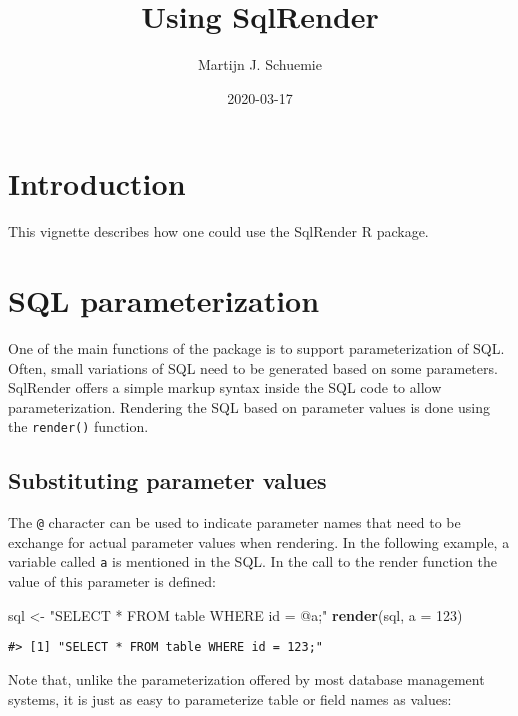\documentclass[
]{article}
\title{Using SqlRender}
\author{Martijn J. Schuemie}
\date{2020-03-17}
\newenvironment{Shaded}{\begin{snugshade}}{\end{snugshade}}
\newcommand{\DataTypeTok}[1]{\textcolor[rgb]{0.13,0.29,0.53}{#1}}
\newcommand{\DecValTok}[1]{\textcolor[rgb]{0.00,0.00,0.81}{#1}}
\newcommand{\KeywordTok}[1]{\textcolor[rgb]{0.13,0.29,0.53}{\textbf{#1}}}
\newcommand{\NormalTok}[1]{#1}
\newcommand{\StringTok}[1]{\textcolor[rgb]{0.31,0.60,0.02}{#1}}
\begin{document}
\maketitle

{
\setcounter{tocdepth}{2}
\tableofcontents
}
\hypertarget{introduction}{%
\section{Introduction}\label{introduction}}

This vignette describes how one could use the SqlRender R package.

\hypertarget{sql-parameterization}{%
\section{SQL parameterization}\label{sql-parameterization}}

One of the main functions of the package is to support parameterization
of SQL. Often, small variations of SQL need to be generated based on
some parameters. SqlRender offers a simple markup syntax inside the SQL
code to allow parameterization. Rendering the SQL based on parameter
values is done using the \texttt{render()} function.

\hypertarget{substituting-parameter-values}{%
\subsection{Substituting parameter
values}\label{substituting-parameter-values}}

The \texttt{@} character can be used to indicate parameter names that
need to be exchange for actual parameter values when rendering. In the
following example, a variable called \texttt{a} is mentioned in the SQL.
In the call to the render function the value of this parameter is
defined:

\begin{Shaded}
\begin{Highlighting}[]
\NormalTok{sql <-}\StringTok{ "SELECT * FROM table WHERE id = @a;"}
\KeywordTok{render}\NormalTok{(sql, }\DataTypeTok{a =} \DecValTok{123}\NormalTok{)}
\end{Highlighting}
\end{Shaded}

\begin{verbatim}
#> [1] "SELECT * FROM table WHERE id = 123;"
\end{verbatim}

Note that, unlike the parameterization offered by most database
management systems, it is just as easy to parameterize table or field
names as values:
\end{document}
